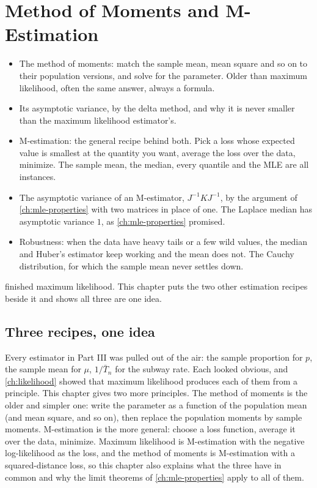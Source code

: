 \chapter{Method of Moments and M-Estimation}
\label{ch:mom-mestimation}

\begin{chaptergoals}
\begin{itemize}[nosep]
\item The method of moments: match the sample mean, mean square and so on to their population versions, and solve for the parameter. Older than maximum likelihood, often the same answer, always a formula.
\item Its asymptotic variance, by the delta method, and why it is never smaller than the maximum likelihood estimator's.
\item M-estimation: the general recipe behind both. Pick a loss whose expected value is smallest at the quantity you want, average the loss over the data, minimize. The sample mean, the median, every quantile and the MLE are all instances.
\item The asymptotic variance of an M-estimator, $J^{-1}KJ^{-1}$, by the argument of \cref{ch:mle-properties} with two matrices in place of one. The Laplace median has asymptotic variance $1$, as \cref{ch:mle-properties} promised.
\item Robustness: when the data have heavy tails or a few wild values, the median and Huber's estimator keep working and the mean does not. The Cauchy distribution, for which the sample mean never settles down.
\end{itemize}
 finished maximum likelihood. This chapter puts the two other estimation recipes beside it and shows all three are one idea.
\end{chaptergoals}

\section{Three recipes, one idea}
\label{sec:mom-idea}

Every estimator in Part III was pulled out of the air: the sample proportion for $p$, the sample mean for $\mu$, $1/\bar{T}_n$ for the subway rate.
Each looked obvious, and \cref{ch:likelihood} showed that maximum likelihood produces each of them from a principle.
This chapter gives two more principles.
The method of moments is the older and simpler one: write the parameter as a function of the population mean (and mean square, and so on), then replace the population moments by sample moments.
M-estimation is the more general: choose a loss function, average it over the data, minimize.
Maximum likelihood is M-estimation with the negative log-likelihood as the loss, and the method of moments is M-estimation with a squared-distance loss, so this chapter also explains what the three have in common and why the limit theorems of \cref{ch:mle-properties} apply to all of them.

